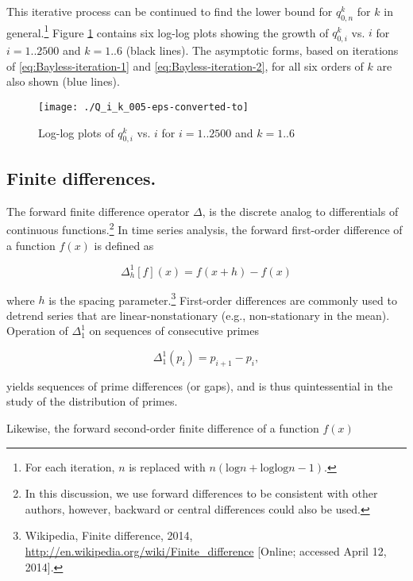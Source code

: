 \documentclass[12pt,longtitle,times]{amsart}
\begin{document}
This iterative process can be continued to find the lower bound for $q_{0,n}^k$ for $k$ in general.\footnote{For each iteration, $n$ is replaced with $n(\text{log}n + \text{log}\text{log}n-1)$.} Figure \ref{fig:Q_i_k_004} contains six log-log plots showing the growth of $q_{0,i}^k$ vs. $i$ for $i = 1..2500$ and $k = 1..6$ (black lines). The asymptotic forms, based on iterations of \eqref{eq:Bayless-iteration-1} and \eqref{eq:Bayless-iteration-2}, for all six orders of $k$ are also shown (blue lines). 

\begin{figure}[h]
\centering
\texttt{[image: ./Q\_i\_k\_005-eps-converted-to]}
\caption{Log-log plots of $q_{0,i}^k$ vs. $i$ for $i = 1..2500$ and $k = 1..6$}
\label{fig:Q_i_k_004}
\end{figure}

\subsection[short]{Finite differences.} The forward finite difference operator $\Delta$, is the discrete analog to differentials of continuous functions.\footnote{In this discussion, we use forward differences to be consistent with other authors, however, backward or central differences could also be used.} In time series analysis, the forward first-order difference of a function $f(x)$ is defined as

\begin{equation*}
\Delta_h^1[f](x)=f(x+h)-f(x)
\end{equation*}

 where $h$ is the spacing parameter.\footnote{\label{Wiki-finite-difference}Wikipedia, Finite difference, 2014, \url{http://en.wikipedia.org/wiki/Finite_difference} [Online; accessed April 12, 2014].} First-order differences are commonly used to detrend series that are linear-nonstationary (e.g., non-stationary in the mean). Operation of $\Delta_1^1$ on sequences of consecutive primes 
 
 \begin{equation*}
 \Delta_1^1(p_i)=p_{i+1}-p_i,
 \end{equation*} 
 
 yields sequences of prime differences (or gaps), and is thus quintessential in the study of the distribution of primes.\cite{Erdos-The-Difference-1940,Erdos-Some-New-Questions-1948,Odlyzko-Jumping-1999,Odlyzyko-Iterated-Abs-Val-1993}
 
 Likewise, the forward second-order finite difference of a function $f(x)$
 
\end{document}
